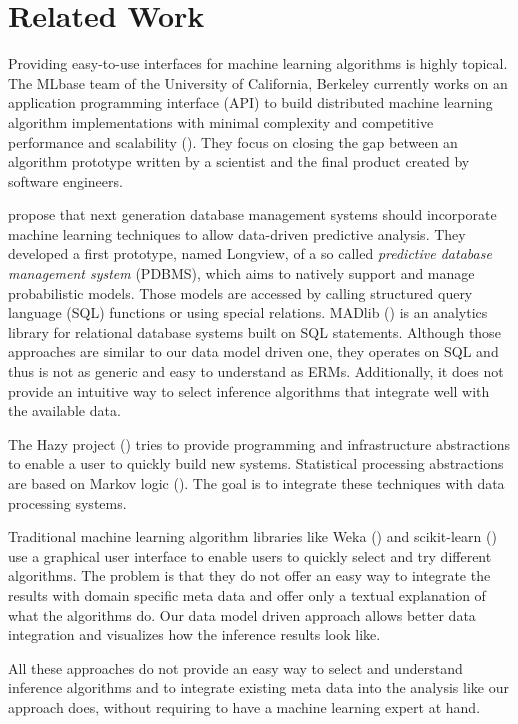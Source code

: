 \section{Related Work}

Providing easy-to-use interfaces for machine learning algorithms is highly topical. The MLbase team of the University of California, Berkeley currently works on an application programming interface (API) to build distributed machine learning algorithm implementations with minimal complexity and competitive performance and scalability (\cite{sparks2013mli}). They focus on closing the gap between an algorithm prototype written by a scientist and the final product created by software engineers.

\textcite{akdere2011case} propose that next generation database management systems should incorporate machine learning techniques to allow data-driven predictive analysis. They developed a first prototype, named Longview, of a so called \emph{predictive database management system} (PDBMS), which aims to natively support and manage probabilistic models. Those models are accessed by calling structured query language (SQL) functions or using special relations. MADlib (\cite{hellerstein2012madlib}) is an analytics library for relational database systems built on SQL statements. Although those approaches are similar to our data model driven one, they operates on SQL and thus is not as generic and easy to understand as ERMs. Additionally, it does not provide an intuitive way to select inference algorithms that integrate well with the available data.

The Hazy project (\cite{kumar2013hazy}) tries to provide programming and infrastructure abstractions to enable a user to quickly build new systems. Statistical processing abstractions are based on Markov logic (\cite{domingos2007markov}). The goal is to integrate these techniques with data processing systems.

Traditional machine learning algorithm libraries like Weka (\cite{hall2009weka}) and scikit-learn (\cite{scikit-learn}) use a graphical user interface to enable users to quickly select and try different algorithms. The problem is that they do not offer an easy way to integrate the results with domain specific meta data and offer only a textual explanation of what the algorithms do. Our data model driven approach allows better data integration and visualizes how the inference results look like.

All these approaches do not provide an easy way to select and understand inference algorithms and to integrate existing meta data into the analysis like our approach does, without requiring to have a machine learning expert at hand.

